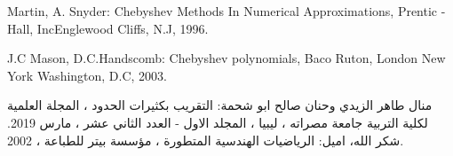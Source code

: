 \documentclass{arabicClass}
\begin{document}
	\renewcommand{\jot}{10pt}
	
	\amiri
	
	
	
	\clearpage
	\arabicfont
	\tableofcontents
\clearpage
{}


\clearpage
{}




%



\begin{thebibliography}{9}
	\begin{english}
		Martin, A. Snyder: Chebyshev Methods In Numerical Approximations, Prentic -Hall, IncEnglewood Cliffs, N.J, 1996.
		
		J.C Mason, D.C.Handscomb: Chebyshev polynomials, Baco Ruton, London New York Washington, D.C, 2003.
	\end{english}
منال طاهر الزيدي وحنان صالح ابو شحمة: التقريب بكثيرات الحدود ، المجلة العلمية لكلية التربية 
جامعة مصراته ، ليبيا ، المجلد الاول - العدد الثاني عشر ، مارس 2019.
شكر الله، اميل: الرياضيات الهندسية المتطورة ، مؤسسة بيتر للطباعة ، 2002.
\end{thebibliography}
\end{document}
